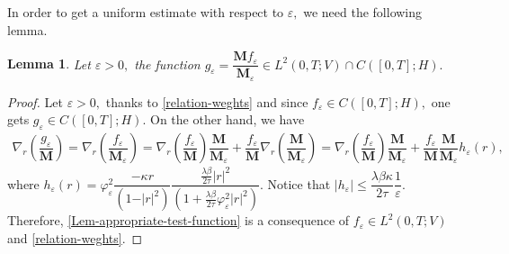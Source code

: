 \documentclass[a4paper,12pt, reqno]{amsart}
\newtheorem{lemma}[theorem]{Lemma}
\begin{document}
In order to get a uniform estimate with respect to $\varepsilon,$ we need the following lemma.
\begin{lemma}\label{Lem-appropriate-test-function}
 Let $\varepsilon>0,$ the function $g_\varepsilon=\dfrac{\mathbf{M}f_\varepsilon}{\mathbf{M}_\varepsilon}  \in L^2(0, T;V) \cap C([0, T];H).$ 
\end{lemma}
\begin{proof}
Let $\varepsilon>0,$   thanks to \eqref{relation-weghts} and since $f_\varepsilon\in C([0, T];H),$ one gets $g_\varepsilon \in  C([0, T];H).$ On the other hand, we have
  \begin{align*}
      \nabla_r(\dfrac{g_\varepsilon}{\mathbf{M}})=\nabla_r(\dfrac{f_\varepsilon}{\mathbf{M}_\varepsilon})=\nabla_r(\dfrac{f_\varepsilon}{\mathbf{M}})\dfrac{\mathbf{M}}{\mathbf{M}_\varepsilon}+\dfrac{f_\varepsilon}{\mathbf{M}} \nabla_r(\dfrac{\mathbf{M}}{\mathbf{M}_\varepsilon})= \nabla_r(\dfrac{f_\varepsilon}{\mathbf{M}})\dfrac{\mathbf{M}}{\mathbf{M}_\varepsilon}+\dfrac{f_\varepsilon}{\mathbf{M}} \dfrac{\mathbf{M}}{\mathbf{M}_\varepsilon}h_\varepsilon(r),
  \end{align*}
  where $h_\varepsilon(r)=\varphi_\varepsilon^2\dfrac{-\kappa r}{(1-\vert r\vert^2)} \dfrac{\frac{\lambda\beta}{2 \tau}\vert r\vert^2 }{(1+\frac{\lambda\beta}{2 \tau}\varphi_\varepsilon^2 \vert r\vert^2)}.$ Notice that $\vert h_\varepsilon\vert \leq \dfrac{\lambda\beta\kappa}{2 \tau}\dfrac{1}{\varepsilon} $.  Therefore, \autoref{Lem-appropriate-test-function} is a consequence of    $f_\varepsilon\in L^2(0, T;V)$ and  \eqref{relation-weghts}. 
\end{proof}
\end{document}
